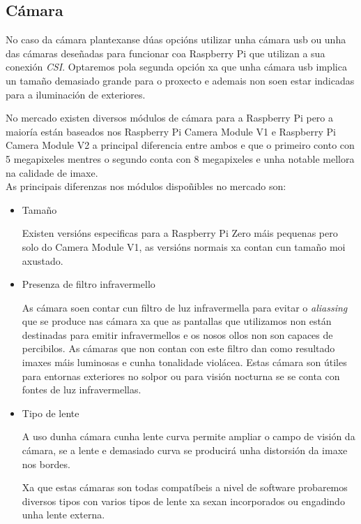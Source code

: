 \subsection{Cámara}

No caso da cámara plantexanse dúas opcións utilizar unha cámara usb ou unha das cámaras deseñadas para funcionar coa Raspberry Pi que utilizan a sua conexión \emph{CSI}. Optaremos pola segunda opción xa que unha cámara usb implica un tamaño demasiado grande para o proxecto e ademais non soen estar indicadas para a iluminación de exteriores.

No mercado existen diversos módulos de cámara para a Raspberry Pi pero a maioría están baseados nos Raspberry Pi Camera Module V1 e Raspberry Pi Camera Module V2 a principal diferencia entre ambos e que o primeiro conto con 5 megapixeles mentres o segundo conta con 8 megapixeles e unha notable mellora na calidade de imaxe.\\

As principais diferenzas nos módulos dispoñibles no mercado son:
\begin{itemize}
    \item Tamaño

Existen versións especificas para a Raspberry Pi Zero máis pequenas pero solo do Camera Module V1, as versións normais xa contan cun tamaño moi axustado.

    \item Presenza de filtro infravermello

As cámara soen contar cun filtro de luz infravermella para evitar o \emph{aliassing} que se produce nas cámara xa que as pantallas que utilizamos non están destinadas para emitir infravermellos e os nosos ollos non son capaces de percibilos. As cámaras que non contan con este filtro dan como resultado imaxes máis luminosas e cunha tonalidade violácea. Estas cámara son útiles para entornas exteriores no solpor ou para visión nocturna se se conta con fontes de luz infravermellas.

    \item Tipo de lente

A uso dunha cámara cunha lente curva permite ampliar o campo de visión da cámara, se a lente e demasiado curva se producirá unha distorsión da imaxe nos bordes.

Xa que estas cámaras son todas compatíbeis a nivel de software probaremos diversos tipos con varios tipos de lente xa sexan incorporados ou engadindo unha lente externa.
\end{itemize}




